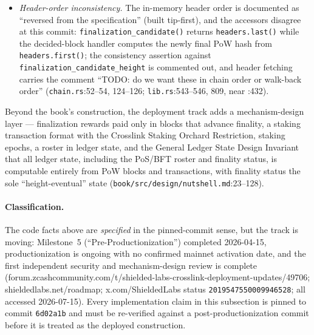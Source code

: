\documentclass[11pt,a4paper]{article}
\theoremstyle{definition}
\begin{document}
\begin{itemize}
  knows the PoW block referenced by \texttt{headers.first()}. The
  Linearity rule, Tail Confirmation validation, and the Confirmed
  best-chain criterion are \emph{not} enforced on this path; the
  decided-block handler additionally verifies fat-pointer signatures,
  with a TODO to check the public keys against the roster
  (\texttt{zebra-crosslink/src/chain.rs}:61--151, 99--104;
  \texttt{zebra-crosslink/src/lib.rs}:522--541, 790--822).
\item \emph{Header-order inconsistency.} The in-memory header order is
  documented as ``reversed from the specification'' (built tip-first),
  and the accessors disagree at this commit:
  \texttt{finalization\_candidate()} returns \texttt{headers.last()}
  while the decided-block handler computes the newly final PoW hash from
  \texttt{headers.first()}; the consistency assertion against
  \texttt{finalization\_candidate\_height} is commented out, and header
  fetching carries the comment ``TODO: do we want these in chain order or
  walk-back order'' (\texttt{chain.rs}:52--54, 124--126;
  \texttt{lib.rs}:543--546, 809, near :432).
\end{itemize}

Beyond the book's construction, the deployment track adds a
mechanism-design layer --- finalization rewards paid only in blocks that
advance finality, a staking transaction format with the Crosslink Staking
Orchard Restriction, staking epochs, a roster in ledger state, and the
General Ledger State Design Invariant that all ledger state, including
the PoS/BFT roster and finality status, is computable entirely from PoW
blocks and transactions, with finality status the sole
``height-eventual'' state (\texttt{book/src/design/nutshell.md}:23--128).

\paragraph{Classification.} The code facts above are \emph{specified} in
the pinned-commit sense, but the track is moving: Milestone~5
(``Pre-Productionization'') completed 2026-04-15, productionization is
ongoing with no confirmed mainnet activation date, and the first
independent security and mechanism-design review is complete
(forum.zcashcommunity.com/t/shielded-labs-crosslink-deployment-updates/49706;
shieldedlabs.net/roadmap; x.com/ShieldedLabs status
\texttt{2019547550009946528}; all accessed 2026-07-15). Every
implementation claim in this subsection is pinned to commit
\texttt{6d02a1b} and must be re-verified against a post-productionization
commit before it is treated as the deployed construction.
\end{document}

